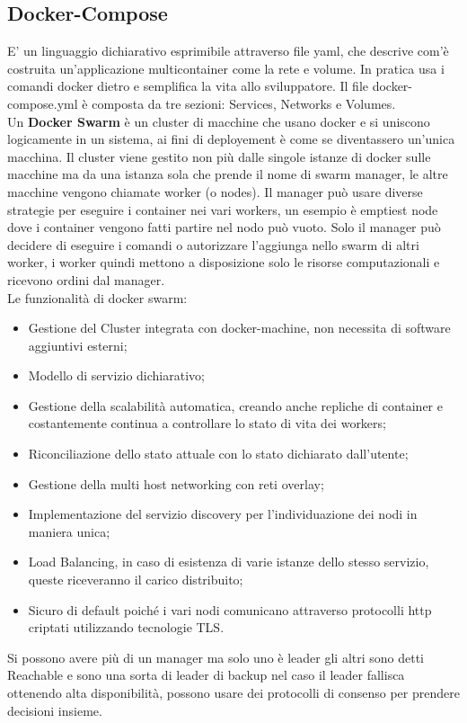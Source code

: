 \documentclass[11pt, twocolumn]{article}
\newenvironment{myitemize}
{ \begin{itemize}[topsep=0ex]
		\setlength{\itemsep}{0pt}
		\setlength{\parskip}{0pt}
		\setlength{\parsep}{0pt}     }
	{ \end{itemize}                  }
\begin{document}
\subsection{Docker-Compose}
E' un linguaggio dichiarativo esprimibile attraverso file yaml, che descrive com'è costruita un'applicazione multicontainer come la rete e volume.
In pratica usa i comandi docker dietro e semplifica la vita allo sviluppatore. Il file docker-compose.yml è composta da tre sezioni: Services, Networks e Volumes.\\
Un \textbf{Docker Swarm} è un cluster di macchine che usano docker e si uniscono logicamente in un sistema, ai fini di deployement è come se diventassero un'unica macchina.
Il cluster viene gestito non più dalle singole istanze di docker sulle macchine ma da una istanza sola che prende il nome di swarm manager, le altre macchine vengono chiamate worker (o nodes).
Il manager può usare diverse strategie per eseguire i container nei vari workers, un esempio è emptiest node dove i container vengono fatti partire nel nodo può vuoto.
Solo il manager può decidere di eseguire i comandi o autorizzare l'aggiunga nello swarm di altri worker, i worker quindi mettono a disposizione solo le risorse computazionali e ricevono ordini dal manager.\\
Le funzionalità di docker swarm:
\begin{myitemize}
	\item Gestione del Cluster integrata con docker-machine, non necessita di software aggiuntivi esterni;
	\item Modello di servizio dichiarativo;
	\item Gestione della scalabilità automatica, creando anche repliche di container e costantemente continua a controllare lo stato di vita dei workers;
	\item Riconciliazione dello stato attuale con lo stato dichiarato dall'utente;
	\item Gestione della multi host networking con reti overlay;
	\item Implementazione del servizio discovery per l'individuazione dei nodi in maniera unica;
	\item Load Balancing, in caso di esistenza di varie istanze dello stesso servizio, queste riceveranno il carico distribuito;
	\item Sicuro di default poiché i vari nodi comunicano attraverso protocolli http criptati utilizzando tecnologie TLS.
\end{myitemize}
Si possono avere più di un manager ma solo uno è leader gli altri sono detti Reachable e sono una sorta di leader di backup nel caso il leader fallisca ottenendo alta disponibilità, possono usare dei protocolli di consenso per prendere decisioni insieme.
\end{document}
